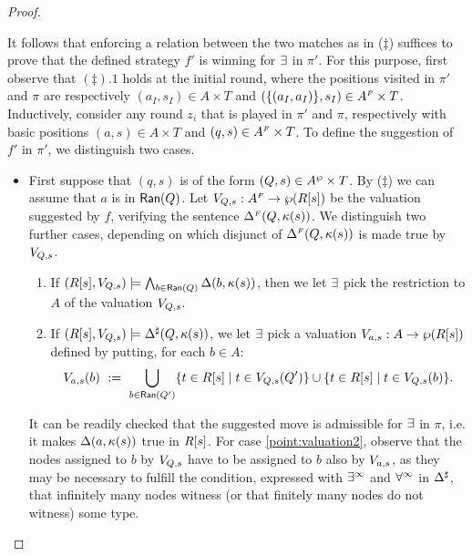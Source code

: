 \begin{proof}
\begin{enumerate}[(i)]
It follows that enforcing a relation between the two matches as in ($\ddag$) suffices to prove that the defined strategy $f'$ is winning for $\exists$ in $\pi'$. For this purpose, first observe that $(\ddag).1$ holds at the initial round, where the positions visited in $\pi'$ and $\pi$ are respectively $(a_I,s_I) \in A \times T$ and $(\{(a_I,a_I)\},s_I) \in A^{{\scriptscriptstyle F}} \times T$. Inductively, consider any round $z_i$ that is played in $\pi'$ and $\pi$, respectively with basic positions $(a,s) \in A \times T$ and $(q,s) \in A^{{\scriptscriptstyle F}} \times T$. To define the suggestion of $f'$ in $\pi'$, we distinguish two cases.
\begin{itemize}
  \item First suppose that $(q,s)$ is of the form $(Q,s) \in
  A^{\wp}\times T$. By ($\ddag$) we can assume that $a$ is in $\mathsf{Ran}(Q)$. Let $V_{Q,s} :A^{{\scriptscriptstyle F}} \rightarrow \wp(R[s])$ be the valuation suggested by $f$, verifying the sentence $\Delta^{{\scriptscriptstyle F}}(Q,\kappa(s))$. We distinguish two further cases, depending on which disjunct of $\Delta^{{\scriptscriptstyle F}}(Q,\kappa(s))$ is made true by $V_{Q,s}$.
      \begin{enumerate}[label=(\roman*), ref=\roman*]
        \item If $(R[s],V_{Q,s})\models \bigwedge_{b \in \mathsf{Ran}(Q)} \Delta(b,\kappa(s))$, then we let $\exists$ pick the restriction to $A$ of the valuation $V_{Q,s}$. \label{point:valuation1}
        \item If $(R[s],V_{Q,s})\models \Delta^{\sharp}(Q,\kappa(s))$, we let $\exists$ pick a valuation $V_{a,s}:A \rightarrow \wp (R[s])$ defined by putting, for each $b \in A$:
            \begin{align*}
               V_{a,s}(b)\ :=\ \bigcup_{b \in \mathsf{Ran}(Q')} \{t \in R[s] \mid t \in V_{Q,s}(Q')\} 
               \cup  \{t \in R[s] \mid t \in V_{Q,s}(b)\} .
            \end{align*} \label{point:valuation2}
      \end{enumerate}
      It can be readily checked that the suggested move is admissible for $\exists$ in $\pi$, i.e. it makes $\Delta(a,\kappa(s))$ true in $R[s]$. For case \eqref{point:valuation2}, observe that the nodes assigned to $b$ by $V_{Q,s}$ have to be assigned to $b$ also by $V_{a,s}$, as they may be necessary to fulfill the condition, expressed with $\exists^\infty$ and $\forall^\infty$ in $\Delta^{\sharp}$, that infinitely many nodes witness (or that finitely many nodes do not witness) some type.


\end{itemize}
\end{enumerate}
\end{proof}
